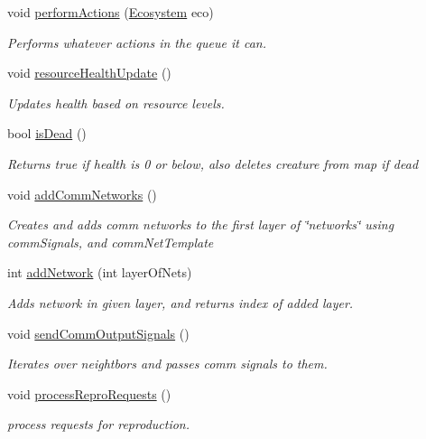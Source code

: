 \begin{DoxyCompactItemize}
void \mbox{\hyperlink{class_creature_a4bdf06ee073ffb00f7410f791caaccdc}{perform\+Actions}} (\mbox{\hyperlink{class_ecosystem}{Ecosystem}} eco)
\begin{DoxyCompactList}\small\item\em Performs whatever actions in the queue it can. \end{DoxyCompactList}\item 
void \mbox{\hyperlink{class_creature_afa20bf76dd7678a5e60b75e2dadaa6ac}{resource\+Health\+Update}} ()
\begin{DoxyCompactList}\small\item\em Updates health based on resource levels. \end{DoxyCompactList}\item 
bool \mbox{\hyperlink{class_creature_a1938298b04f9a74b1692771a9f050478}{is\+Dead}} ()
\begin{DoxyCompactList}\small\item\em Returns true if health is 0 or below, also deletes creature from map if dead \end{DoxyCompactList}\item 
void \mbox{\hyperlink{class_creature_a617588216838f0fe3f8861f38c2746f2}{add\+Comm\+Networks}} ()
\begin{DoxyCompactList}\small\item\em Creates and adds comm networks to the first layer of \char`\"{}networks\char`\"{} using comm\+Signals, and comm\+Net\+Template \end{DoxyCompactList}\item 
int \mbox{\hyperlink{class_creature_aafecd84cf3b44bcb8dd67cd9518e3326}{add\+Network}} (int layer\+Of\+Nets)
\begin{DoxyCompactList}\small\item\em Adds network in given layer, and returns index of added layer. \end{DoxyCompactList}\item 
void \mbox{\hyperlink{class_creature_ab103ada400a5773ae0d34c11b3abf2d4}{send\+Comm\+Output\+Signals}} ()
\begin{DoxyCompactList}\small\item\em Iterates over neightbors and passes comm signals to them. \end{DoxyCompactList}\item 
void \mbox{\hyperlink{class_creature_a13b61e24bb6dfa9cd53e7919378c4b0c}{process\+Repro\+Requests}} ()
\begin{DoxyCompactList}\small\item\em process requests for reproduction. \end{DoxyCompactList}\item 

\end{DoxyCompactItemize}
